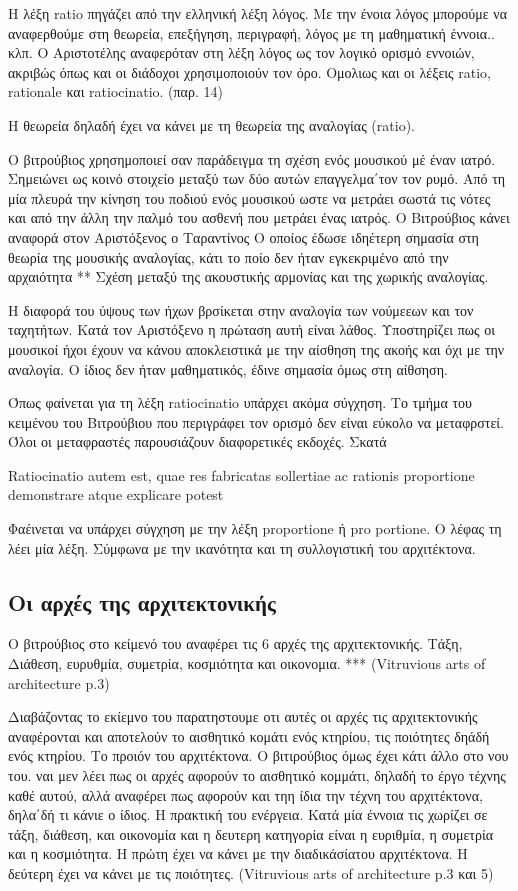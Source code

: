  Η λέξη ratio πηγάζει από την ελληνική λέξη λόγος. Με την ένοια λόγος μπορούμε να αναφερθούμε στη θεωρεία, επεξήγηση, περιγραφή, λόγος με τη μαθηματική έννοια.. κλπ. Ο Αριστοτέλης αναφερόταν στη λέξη λόγος ως τον λογικό ορισμό εννοιών, ακριβώς όπως και οι διάδοχοι χρησιμοποιούν τον όρο. Ομολιως και οι λέξεις ratio, rationale και ratiocinatio. (παρ. 14)
 
 Η θεωρεία δηλαδή έχει να κάνει με τη θεωρεία της αναλογίας (ratio). 
 
 Ο βιτρούβιος χρησημοποιεί σαν παράδειγμα τη σχέση ενός μουσικού μέ έναν ιατρό. Σημειώνει ως κοινό στοιχείο μεταξύ των δύο αυτών επαγγελμα΄τον τον ρυμό. Από τη μία πλευρά την κίνηση του ποδιού ενός μουσικού ωστε να μετράει σωστά τις νότες και από την άλλη την παλμό του ασθενή που μετράει ένας ιατρός. Ο Βιτρούβιος κάνει αναφορά στον Αριστόξενος ο Ταραντίνος Ο οποίος έδωσε ιδηέτερη σημασία στη θεωρία της μουσικής αναλογίας, κάτι το ποίο δεν ήταν εγκεκριμένο από την αρχαιότητα ** Σχέση μεταξύ της ακουστικής αρμονίας και της χωρικής αναλογίας. 
 
 Η διαφορά του ύψους των ήχων βρσίκεται στην αναλογία των νούμεεων και τον ταχητήτων. Κατά τον Αριστόξενο η πρώταση αυτή είναι λάθος. Υποστηρίζει πως οι μουσικοί ήχοι έχουν να κάνου αποκλειστικά με την αίσθηση της ακοής και όχι με την αναλογία. Ο ίδιος δεν ήταν μαθηματικός, έδινε σημασία όμως στη αίθσηση. 
 
 Όπως φαίνεται για τη λέξη ratiocinatio υπάρχει ακόμα σύγχηση. Το τμήμα του κειμένου του Βιτρούβιου που περιγράφει τον ορισμό δεν είναι εύκολο να μεταφρστεί. Όλοι οι μεταφραστές παρουσιάζουν διαφορετικές εκδοχές. Σκατά
 
  Ratiocinatio autem est, quae res fabricatas sollertiae ac rationis proportione demonstrare atque explicare potest
  
  Φαέινεται να υπάρχει σύγχηση με την λέξη proportione ή pro portione. Ο λέφας τη λέει μία λέξη. 
  Σύμφωνα με την ικανότητα και τη συλλογιστική του αρχιτέκτονα.
  
\subsection{Οι αρχές της αρχιτεκτονικής}
  
  Ο βιτρούβιος στο κείμενό του αναφέρει τις 6 αρχές της αρχιτεκτονικής. Τάξη, Διάθεση, ευρυθμία, συμετρία, κοσμιότητα και οικονομια. *** (Vitruvious arts of architecture p.3)
  
  Διαβάζοντας το εκίεμνο του παρατηστουμε οτι αυτές οι αρχές τις αρχιτεκτονικής αναφέρονται και αποτελούν το αισθητικό κομάτι ενός κτηρίου, τις ποιότητες δηάδή ενός κτηρίου. Το προιόν του αρχιτέκτονα. Ο βιτιρούβιος όμως έχει κάτι άλλο στο νου του. ναι μεν λέει πως οι αρχές αφορούν το αισθητικό κομμάτι, δηλαδή το έργο τέχνης καθέ αυτού, αλλά αναφέρει πως αφορούν και τηη ίδια την τέχνη του αρχιτέκτονα, δηλα΄δή τι κάνιε ο ίδιος. Η πρακτική του ενέργεια. Κατά μία έννοια τις χωρίζει σε τάξη, διάθεση, και οικονομία και η δευτερη κατηγορία είναι η ευριθμία, η συμετρία και η κοσμιότητα. Η πρώτη έχει να κάνει με την διαδικάσίατου αρχιτέκτονα. Η δεύτερη έχει να κάνει με τις ποιότητες. (Vitruvious arts of architecture p.3 και 5)
  
